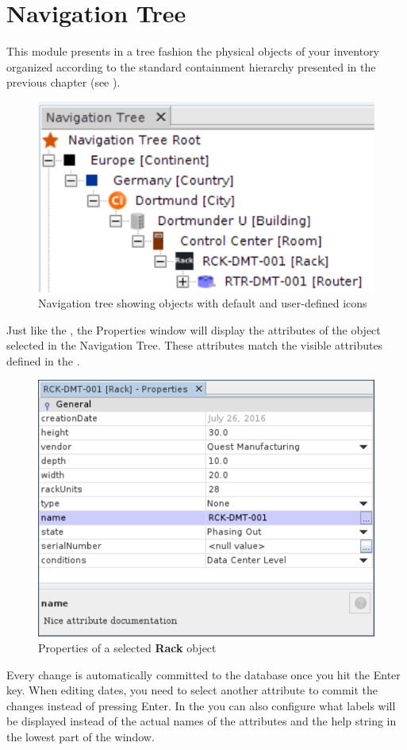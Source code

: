 \documentclass[a4paper]{article}
\begin{document}
	\section{Navigation Tree} \label{sec:navigation_tree}
	This module presents in a tree fashion the physical objects of your inventory organized according to the standard containment hierarchy presented in the previous chapter (see \textbf{}).
	\begin{figure}[h!]
		\centering
		\includegraphics[width=0.4\linewidth]{img/navigation_tree.png}
		\caption{Navigation tree showing objects with default and user-defined icons}
		\label{fig:navigation_tree}
	\end{figure}
	Just like the , the Properties window will display the attributes of the object selected in the Navigation Tree. These attributes match the visible attributes defined in the \textbf{}.
	\begin{figure}[h!]
		\centering
		\includegraphics[width=0.5\linewidth]{img/navigation_tree_properties.png}
		\caption{Properties of a selected \textbf{Rack} object}
		\label{fig:navigation_tree_properties}
	\end{figure}
	Every change is automatically committed to the database once you hit the Enter key. When editing dates, you need to select another attribute to commit the changes instead of pressing Enter. In the \textbf{} you can also configure what labels will be displayed instead of the actual names of the attributes and the help string in the lowest part of the window.\newline
	
\end{document}
